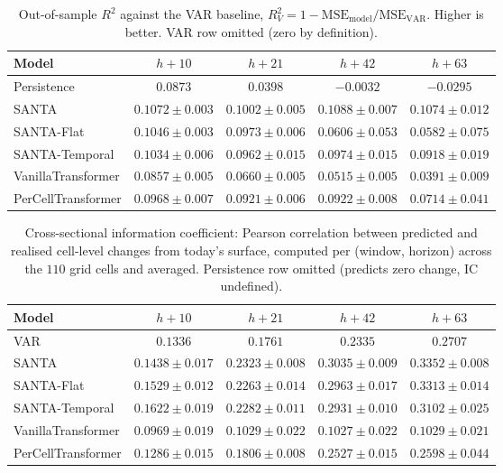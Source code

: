 \begin{table}[h]
\centering
\caption{Out-of-sample $R^2$ against the VAR baseline, $R^2_V = 1 - \mathrm{MSE}_\text{model}/\mathrm{MSE}_\text{VAR}$. Higher is better. VAR row omitted (zero by definition).}
\label{tab:headline_r2_var}
\begin{tabular}{lcccc}
\toprule
Model & $h{+}10$ & $h{+}21$ & $h{+}42$ & $h{+}63$ \\
\midrule
Persistence            & $0.0873$ & $0.0398$ & $-0.0032$ & $-0.0295$ \\
\midrule
SANTA                  & $\mathbf{0.1072 \pm 0.003}$ & $\mathbf{0.1002 \pm 0.005}$ & $\mathbf{0.1088 \pm 0.007}$ & $\mathbf{0.1074 \pm 0.012}$ \\
SANTA-Flat             & $0.1046 \pm 0.003$ & $0.0973 \pm 0.006$ & $0.0606 \pm 0.053$ & $0.0582 \pm 0.075$ \\
SANTA-Temporal         & $0.1034 \pm 0.006$ & $0.0962 \pm 0.015$ & $0.0974 \pm 0.015$ & $0.0918 \pm 0.019$ \\
\midrule
VanillaTransformer     & $0.0857 \pm 0.005$ & $0.0660 \pm 0.005$ & $0.0515 \pm 0.005$ & $0.0391 \pm 0.009$ \\
PerCellTransformer     & $0.0968 \pm 0.007$ & $0.0921 \pm 0.006$ & $0.0922 \pm 0.008$ & $0.0714 \pm 0.041$ \\
\bottomrule
\end{tabular}
\end{table}

\begin{table}[h]
\centering
\caption{Cross-sectional information coefficient: Pearson correlation between predicted and realised cell-level changes from today's surface, computed per (window, horizon) across the $110$ grid cells and averaged. Persistence row omitted (predicts zero change, IC undefined).}
\label{tab:headline_ic}
\begin{tabular}{lcccc}
\toprule
Model & $h{+}10$ & $h{+}21$ & $h{+}42$ & $h{+}63$ \\
\midrule
VAR                    & $0.1336$ & $0.1761$ & $0.2335$ & $0.2707$ \\
\midrule
SANTA                  & $0.1438 \pm 0.017$ & $\mathbf{0.2323 \pm 0.008}$ & $\mathbf{0.3035 \pm 0.009}$ & $\mathbf{0.3352 \pm 0.008}$ \\
SANTA-Flat             & $0.1529 \pm 0.012$ & $0.2263 \pm 0.014$ & $0.2963 \pm 0.017$ & $0.3313 \pm 0.014$ \\
SANTA-Temporal         & $\mathbf{0.1622 \pm 0.019}$ & $0.2282 \pm 0.011$ & $0.2931 \pm 0.010$ & $0.3102 \pm 0.025$ \\
\midrule
VanillaTransformer     & $0.0969 \pm 0.019$ & $0.1029 \pm 0.022$ & $0.1027 \pm 0.022$ & $0.1029 \pm 0.021$ \\
PerCellTransformer     & $0.1286 \pm 0.015$ & $0.1806 \pm 0.008$ & $0.2527 \pm 0.015$ & $0.2598 \pm 0.044$ \\
\bottomrule
\end{tabular}
\end{table}
